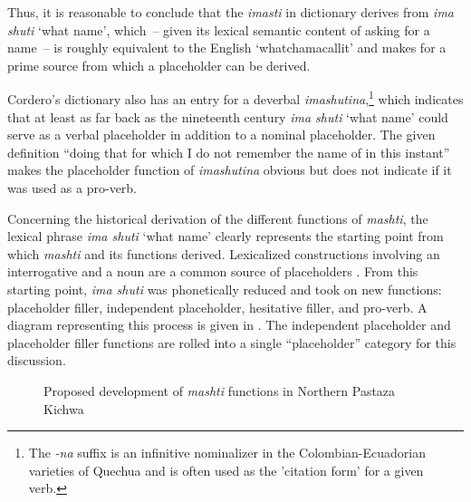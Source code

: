 \documentclass[output=paper]{langscibook}
\begin{document}
Thus, it is reasonable to conclude that the \textit{imasti} in  dictionary derives from \textit{ima shuti} ‘what name’, which~-- given its lexical semantic content of asking for a name~--  is roughly equivalent to the English ‘whatchamacallit’ and makes for a prime source from which a placeholder can be derived. 

Cordero’s dictionary also has an entry for a deverbal \textit{imashutina},\footnote{The \textit{{}-na} suffix is an infinitive nominalizer in the Colombian-Ecuadorian varieties of Quechua and is often used as the 'citation form' for a given verb.} which indicates that at least as far back as the nineteenth century \textit{ima shuti} ‘what name’ could serve as a verbal placeholder in addition to a nominal placeholder. The given definition “doing that for which I do not remember the name of in this instant” makes the placeholder function of \textit{imashutina} obvious but does not indicate if it was used as a pro-verb.

Concerning the historical derivation of the different functions of \textit{mashti}, the lexical phrase \textit{ima shuti} ‘what name’ clearly represents the starting point from which \textit{mashti} and its functions derived. Lexicalized constructions involving an interrogative and a noun are a common source of placeholders \citep[13]{Podlesskaya2010}. From this starting point, \textit{ima shuti} was phonetically reduced and took on new functions: placeholder filler, independent placeholder, hesitative filler, and pro-verb. A diagram representing this process is given in . The independent placeholder and placeholder filler functions are rolled into a single “placeholder” category for this discussion.

\begin{figure}[h]
\caption{\label{fig:rice:13}Proposed development of \textit{mashti} functions in Northern Pastaza Kichwa}
\end{figure}
\end{document}
